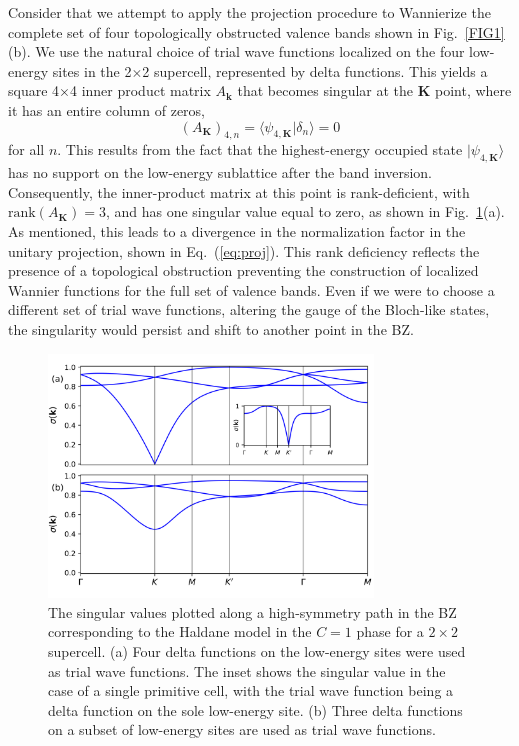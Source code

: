 \documentclass[galley,aps,pra,10pt,amsmath,amssymb,
    superscriptaddress,nofootinbib,longbibliography]{revtex4-2}
\newcounter{comm}
\newcommand{\eq}[1]{Eq.~(\ref{eq:#1})}
\begin{document}
Consider that we attempt to apply the projection procedure to Wannierize the complete set of four topologically obstructed valence bands shown in Fig.~\ref{FIG1}(b). We use the natural choice of trial wave functions localized on the four low-energy sites in the 2$\times$2 supercell, represented by delta functions. This yields a square 4$\times$4 inner product matrix $A_{\mathbf{k}}$ that becomes singular at the $\mathbf{K}$ point, where it has an entire column of zeros, 
\begin{equation}
    (A_{\mathbf{K}})_{4,n} = \langle \psi_{4, \mathbf{K}} | \delta_{n} \rangle = 0
\end{equation}
for all $n$. This results from the fact that the highest-energy occupied state $|\psi_{4, \mathbf{K}}\rangle$ has no support on the low-energy sublattice after the band inversion. Consequently, the inner-product matrix at this point is rank-deficient, with $\text{rank}(A_{\mathbf{K}})=3$, and has one singular value equal to zero, as shown in Fig.~\ref{FIG2}(a). As mentioned, this leads to a divergence in the normalization factor in the unitary projection, shown in \eq{proj}. This rank deficiency reflects the presence of a topological obstruction preventing the construction of localized Wannier functions for the full set of valence bands. Even if we were to choose a different set of trial wave functions, altering the gauge of the Bloch-like states, the singularity would persist and shift to another point in the BZ.  

\begin{figure}[t!]
\begin{center}
\includegraphics[width=3.4in]{fig2.png}
\end{center}
\vspace{-10mm}
\caption{The singular values plotted along a high-symmetry path in the BZ corresponding to the Haldane model in the $C=1$ phase for a $2\times2$ supercell. (a) Four delta functions on the low-energy sites were used as trial wave functions. The inset shows the singular value in the case of a single primitive cell, with the trial wave function being a delta function on the sole low-energy site. (b) Three delta functions on a subset of low-energy sites are used as trial wave functions. }
\label{FIG2}
\end{figure}
\end{document}
